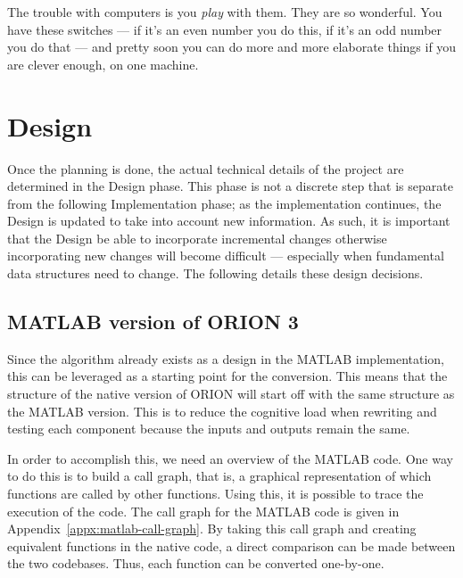\begin{savequote}[0.55\linewidth]
	\begin{fancyquote}
		The trouble with computers is you \emph{play} with them. They are so
		wonderful. You have these switches --- if it's an even number you do
		this, if it's an odd number you do that --- and pretty soon you can
		do more and more elaborate things if you are clever enough, on one
		machine.
	\end{fancyquote}
\end{savequote}
\chapter{Design}\label{ch:design}

Once the planning is done, the actual technical details of the
project are determined in the Design phase. This phase is not a
discrete step that is separate from the following Implementation
phase; as the implementation continues, the Design is updated to
take into account new information. As such, it is important that
the Design be able to incorporate incremental changes otherwise
incorporating new changes will become difficult --- especially
when fundamental data structures need to change. The following
details these design decisions.

\section{MATLAB version of ORION 3}

Since the algorithm already exists as a design in the MATLAB
implementation, this can be leveraged as a starting point for the
conversion. This means that the structure of the native version of
ORION will start off with the same structure as the MATLAB
version. This is to reduce the cognitive load when rewriting and
testing each component because the inputs and outputs remain the
same.

In order to accomplish this, we need an overview of the MATLAB
code. One way to do this is to build a call graph, that is, a
graphical representation of which functions are called by other
functions. Using this, it is possible to trace the execution of
the code. The call graph for the MATLAB code is given in
Appendix~\ref{appx:matlab-call-graph}. By taking this call graph
and creating equivalent functions in the native code, a direct
comparison can be made between the two codebases. Thus, each
function can be converted one-by-one.

